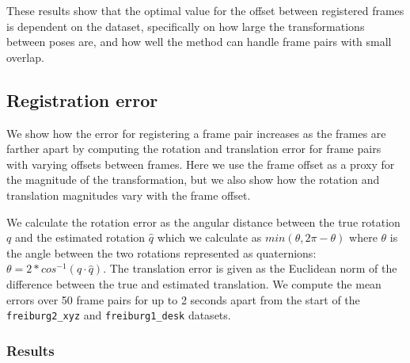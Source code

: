 \documentclass[a4paper]{article}
\begin{document}
These results show that the optimal value for the offset between registered frames is dependent on the dataset, specifically on how large the transformations between poses are, and how well the method can handle frame pairs with small overlap.

\subsection{Registration error}
\label{registration_error}

We show how the error for registering a frame pair increases as the frames are farther apart by computing the rotation and translation error for frame pairs with varying offsets between frames. Here we use the frame offset as a proxy for the magnitude of the transformation, but we also show how the rotation and translation magnitudes vary with the frame offset.

We calculate the rotation error as the angular distance between the true rotation $q$ and the estimated rotation $\hat q$ which we calculate as $min(\theta, 2\pi - \theta)$ where $\theta$ is the angle between the two rotations represented as quaternions: $\theta = 2 * cos^{-1}(q \cdot \hat q)$. %
The translation error is given as the Euclidean norm of the difference between the true and estimated translation. We compute the mean errors over 50 frame pairs for up to 2 seconds apart from the start of the \texttt{freiburg2\_xyz} and \texttt{freiburg1\_desk} datasets.

\subsubsection{Results}
\end{document}
